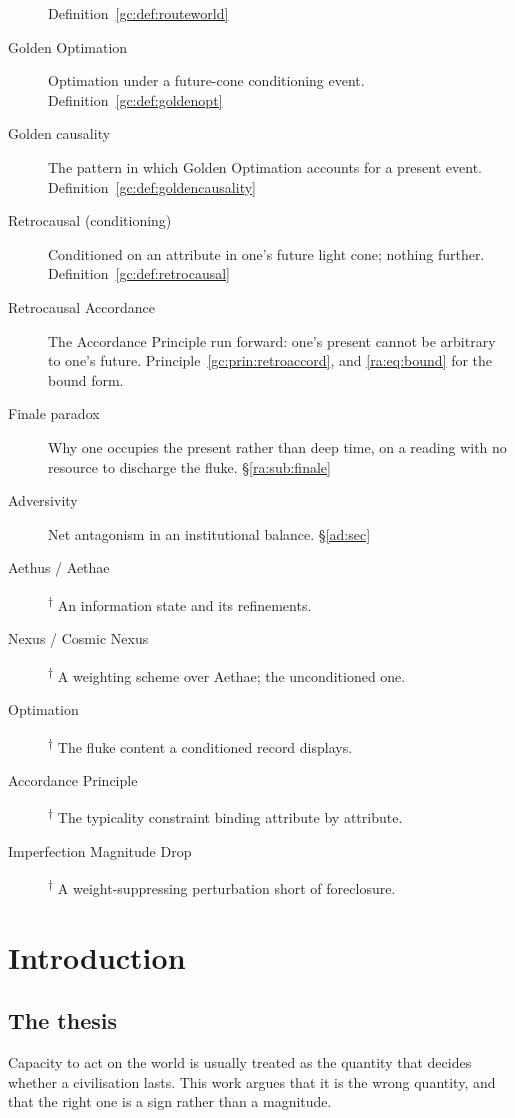 \documentclass[11pt]{article}
\numberwithin{equation}{section}
\theoremstyle{plain}
\theoremstyle{definition}
\theoremstyle{remark}
\begin{document}
\begin{description}
Definition~\ref{gc:def:routeworld}
\item[Golden Optimation] Optimation under a future-cone conditioning
event. Definition~\ref{gc:def:goldenopt}
\item[Golden causality] The pattern in which Golden Optimation accounts
for a present event. Definition~\ref{gc:def:goldencausality}
\item[Retrocausal (conditioning)] Conditioned on an attribute in one's
future light cone; nothing further. Definition~\ref{gc:def:retrocausal}
\item[Retrocausal Accordance] The Accordance Principle run forward: one's
present cannot be arbitrary to one's future.
Principle~\ref{gc:prin:retroaccord}, and \eqref{ra:eq:bound} for the
bound form.
\item[Finale paradox] Why one occupies the present rather than deep time,
on a reading with no resource to discharge the fluke.
\S\ref{ra:sub:finale}
\item[Adversivity] Net antagonism in an institutional balance.
\S\ref{ad:sec}
\item[Aethus / Aethae]\textsuperscript{$\dagger$} An information state
and its refinements.
\item[Nexus / Cosmic Nexus]\textsuperscript{$\dagger$} A weighting scheme
over Aethae; the unconditioned one.
\item[Optimation]\textsuperscript{$\dagger$} The fluke content a
conditioned record displays.
\item[Accordance Principle]\textsuperscript{$\dagger$} The typicality
constraint binding attribute by attribute.
\item[Imperfection Magnitude Drop]\textsuperscript{$\dagger$} A
weight-suppressing perturbation short of foreclosure.
\end{description}


\section{Introduction}\label{intro:sec}

\subsection{The thesis}\label{intro:sub:thesis}

Capacity to act on the world is usually treated as the quantity that
decides whether a civilisation lasts. This work argues that it is the
wrong quantity, and that the right one is a sign rather than a magnitude.
\end{document}
